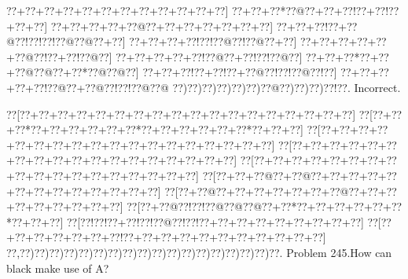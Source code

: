 \documentclass[a5paper]{article}
\begin{document}
\begin{center}
{\goo
\0??+\0??+\0??+\0??+\0??+\0??+\0??+\0??+\0??+\0??+\0??+\0??]
\0??+\0??+\0??*\0??@\0??+\0??+\0??!\0??+\0??!\0??+\0??+\0??]
\0??+\0??+\0??+\0??+\0??@\0??+\0??+\0??+\0??+\0??+\0??+\0??]
\0??+\0??+\0??!\0??+\0??@\0??!\0??!\0??!\0??@\0??@\0??+\0??]
\0??+\0??+\0??+\0??!\0??!\0??@\0??!\0??@\0??+\0??]
\0??+\0??+\0??+\0??+\0??+\0??@\0??!\0??+\0??!\0??@\0??]
\0??+\0??+\0??+\0??+\0??!\0??@\0??+\0??!\0??!\0??@\0??]
\0??+\0??+\0??*\0??+\0??+\0??@\0??@\0??+\0??*\0??@\0??@\0??]
\0??+\0??+\0??!\0??+\0??!\0??+\0??@\0??!\0??!\0??@\0??!\0??]
\0??+\0??+\0??+\0??+\0??!\0??@\0??+\0??@\0??!\0??!\0??@\0??@
\0??)\0??)\0??)\0??)\0??)\0??)\0??@\0??)\0??)\0??)\0??!\0??.
}
Incorrect. 

\end{center}
\newpage
\begin{center}
{\goo
\0??[\0??+\0??+\0??+\0??+\0??+\0??+\0??+\0??+\0??+\0??+\0??+\0??+\0??+\0??+\0??+\0??+\0??+\0??]
\0??[\0??+\0??+\0??*\0??+\0??+\0??+\0??+\0??+\0??*\0??+\0??+\0??+\0??+\0??+\0??*\0??+\0??+\0??]
\0??[\0??+\0??+\0??+\0??+\0??+\0??+\0??+\0??+\0??+\0??+\0??+\0??+\0??+\0??+\0??+\0??+\0??+\0??]
\0??[\0??+\0??+\0??+\0??+\0??+\0??+\0??+\0??+\0??+\0??+\0??+\0??+\0??+\0??+\0??+\0??+\0??+\0??]
\0??[\0??+\0??+\0??+\0??+\0??+\0??+\0??+\0??+\0??+\0??+\0??+\0??+\0??+\0??+\0??+\0??+\0??+\0??]
\0??[\0??+\0??+\0??@\0??+\0??@\0??+\0??+\0??+\0??+\0??+\0??+\0??+\0??+\0??+\0??+\0??+\0??+\0??]
\0??[\0??+\0??@\0??+\0??+\0??+\0??+\0??+\0??+\0??@\0??+\0??+\0??+\0??+\0??+\0??+\0??+\0??+\0??]
\0??[\0??+\0??@\0??!\0??!\0??@\0??@\0??@\0??+\0??*\0??+\0??+\0??+\0??+\0??+\0??*\0??+\0??+\0??]
\0??[\0??!\0??!\0??+\0??!\0??!\0??@\0??!\0??!\0??+\0??+\0??+\0??+\0??+\0??+\0??+\0??+\0??]
\0??[\0??+\0??+\0??+\0??+\0??+\0??+\0??!\0??+\0??+\0??+\0??+\0??+\0??+\0??+\0??+\0??+\0??+\0??]
\0??,\0??)\0??)\0??)\0??)\0??)\0??)\0??)\0??)\0??)\0??)\0??)\0??)\0??)\0??)\0??)\0??)\0??)\0??.
}
Problem 245.How can black make use of A?

\end{center}
\end{document}
